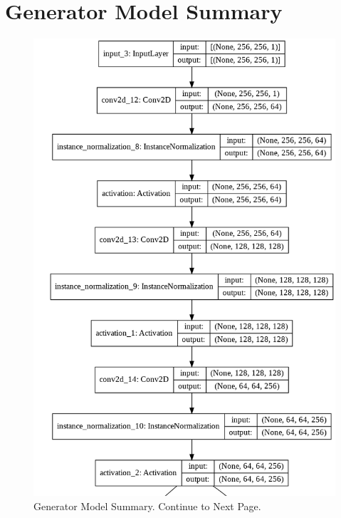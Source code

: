 \section{Generator Model Summary}
\vspace*{2.2cm}
\begin{figure}[H]
	    \begin{center} 
	    \includegraphics[scale=0.60]{images/Appendix/generator_1.png}
	     \caption{Generator Model Summary. Continue to Next Page.}
	     \label{fig:GeneratorModelSummary}
	    \end{center}
\end{figure}


